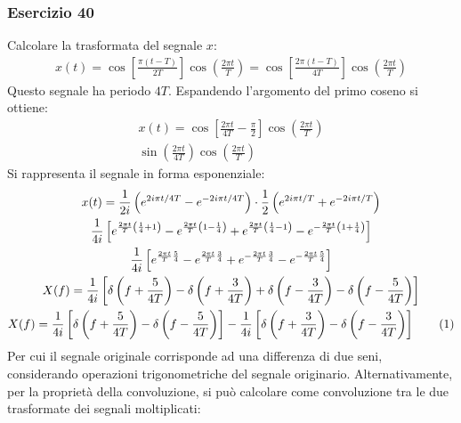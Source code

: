 \documentclass{article}
\newcommand{\tageq}{\tag{\stepcounter{equation}\theequation}}
\begin{document}
\subsubsection*{Esercizio 40}

Calcolare la trasformata del segnale $x$:
\begin{gather*}
    x(t)=\cos\left[\displaystyle\frac{\pi(t-T)}{2T}\right]\cos\left(\frac{2\pi t}{T}\right)=\cos\left[\displaystyle\frac{2\pi(t-T)}{4T}\right]\cos\left(\frac{2\pi t}{T}\right)
\end{gather*}
Questo segnale ha periodo $4T$. Espandendo l'argomento del primo coseno si ottiene:
\begin{gather*}
    x(t)=\displaystyle\cos\left[\frac{2\pi t}{4T}-\frac{\pi}{2}\right]\cos\left(\frac{2\pi t}{T}\right)\\
    \sin\left(\displaystyle\frac{2\pi t}{4T}\right)\cos\left(\frac{2\pi t}{T}\right)
\end{gather*}
Si rappresenta il segnale in forma esponenziale:
\begin{gather*}
    x(t)=\displaystyle\frac{1}{2i}\left(e^{2i\pi t/4T}-e^{-2i\pi t/4T}\right)\cdot\displaystyle\frac{1}{2}\left(e^{2i\pi t/T}+e^{-2i\pi t/T}\right)\\
    \displaystyle\frac{1}{4i}\left[e^{\frac{2\pi t}{T}\left(\frac{1}{4}+1\right)}-e^{\frac{2\pi t}{T}\left(1-\frac{1}{4}\right)}+e^{\frac{2\pi t}{T}\left(\frac{1}{4}-1\right)}-e^{-\frac{2\pi t}{T}\left(1+\frac{1}{4}\right)}\right]\\
    \displaystyle\frac{1}{4i}\left[e^{\frac{2\pi t}{T}\frac{5}{4}}-e^{\frac{2\pi t}{T}\frac{3}{4}}+e^{-\frac{2\pi t}{T}\frac{3}{4}}-e^{-\frac{2\pi t}{T}\frac{5}{4}}\right]\\
    X(f)=\displaystyle\frac{1}{4i}\left[\delta\left(f+\frac{5}{4T}\right)-\delta\left(f+\frac{3}{4T}\right)+\delta\left(f-\frac{3}{4T}\right)-\delta\left(f-\frac{5}{4T}\right)\right]\\
    X(f)=\displaystyle\frac{1}{4i}\left[\delta\left(f+\frac{5}{4T}\right)-\delta\left(f-\frac{5}{4T}\right)\right]-\frac{1}{4i}\left[\delta\left(f+\frac{3}{4T}\right)-\delta\left(f-\frac{3}{4T}\right)\right]\tageq
\end{gather*}
Per cui il segnale originale corrisponde ad una differenza di due seni, considerando operazioni trigonometriche del segnale originario. Alternativamente, per la 
proprietà della convoluzione, si può calcolare come convoluzione tra le due trasformate dei segnali moltiplicati:
\end{document}
